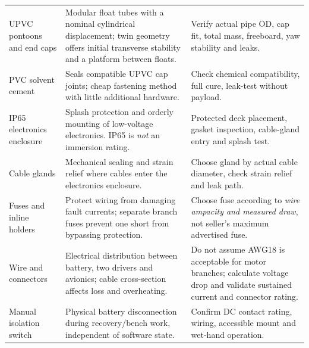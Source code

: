 \begin{longtable}{L{40mm}L{78mm}L{44mm}}
UPVC pontoons and end caps \cite{pipe,cap} & Modular float tubes with a nominal cylindrical displacement; twin geometry offers initial transverse stability and a platform between floats. & Verify actual pipe OD, cap fit, total mass, freeboard, yaw stability and leaks.\\
PVC solvent cement \cite{glue} & Seals compatible UPVC cap joints; cheap fastening method with little additional hardware. & Check chemical compatibility, full cure, leak-test without payload.\\
IP65 electronics enclosure \cite{box} & Splash protection and orderly mounting of low-voltage electronics. IP65 is \emph{not} an immersion rating. & Protected deck placement, gasket inspection, cable-gland entry and splash test.\\
Cable glands \cite{gland} & Mechanical sealing and strain relief where cables enter the electronics enclosure. & Choose gland by actual cable diameter, check strain relief and leak path.\\
Fuses and inline holders \cite{fuse} & Protect wiring from damaging fault currents; separate branch fuses prevent one short from bypassing protection. & Choose fuse according to \emph{wire ampacity and measured draw}, not seller's maximum advertised fuse.\\
Wire and connectors \cite{wire} & Electrical distribution between battery, two drivers and avionics; cable cross-section affects loss and overheating. & Do not assume AWG18 is acceptable for motor branches; calculate voltage drop and validate sustained current and connector rating.\\
Manual isolation switch \cite{kill} & Physical battery disconnection during recovery/bench work, independent of software state. & Confirm DC contact rating, wiring, accessible mount and wet-hand operation.\\
\end{longtable}

